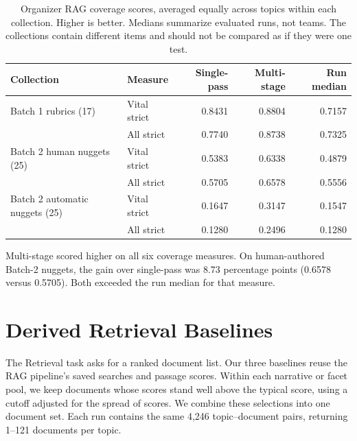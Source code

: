 \documentclass[11pt,letterpaper]{article}
\begin{document}
\begin{table}[H]
\centering\small
\begin{tabular}{@{}llrrr@{}}
\toprule
Collection & Measure & Single-pass & Multi-stage & Run median\\
\midrule
Batch 1 rubrics (17) & Vital strict & 0.8431 & 0.8804 & 0.7157\\
 & All strict & 0.7740 & 0.8738 & 0.7325\\
\midrule
Batch 2 human nuggets (25) & Vital strict & 0.5383 & 0.6338 & 0.4879\\
 & All strict & 0.5705 & 0.6578 & 0.5556\\
\midrule
Batch 2 automatic nuggets (25) & Vital strict & 0.1647 & 0.3147 & 0.1547\\
 & All strict & 0.1280 & 0.2496 & 0.1280\\
\bottomrule
\end{tabular}
\caption{Organizer RAG coverage scores, averaged equally across topics within each collection. Higher is better. Medians summarize evaluated runs, not teams. The collections contain different items and should not be compared as if they were one test.}
\label{tab:official-coverage}
\end{table}

Multi-stage scored higher on all six coverage measures. On human-authored Batch-2 nuggets, the gain over single-pass was 8.73 percentage points (0.6578 versus 0.5705). Both exceeded the run median for that measure.



\clearpage
\section{Derived Retrieval Baselines}
\label{sec:retrieval}
The Retrieval task asks for a ranked document list. Our three baselines reuse the RAG pipeline's saved searches and passage scores. Within each narrative or facet pool, we keep documents whose scores stand well above the typical score, using a cutoff adjusted for the spread of scores. We combine these selections into one document set. Each run contains the same 4,246 topic--document pairs, returning 1--121 documents per topic.
\end{document}
